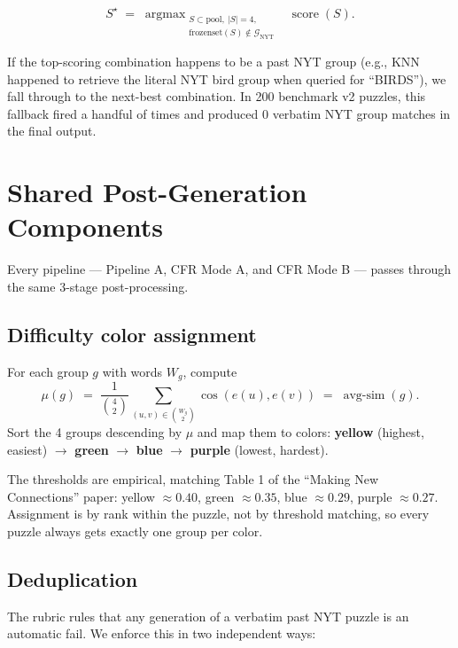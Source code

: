 \documentclass[11pt, letterpaper]{article}
\begin{document}
\begin{equation}
S^{\star} \;=\; \mathop{\arg\max}_{\substack{S \subset \text{pool},\ |S|=4, \\ \text{frozenset}(S) \notin \mathcal{G}_\text{NYT}}} \;\; \operatorname{score}(S).
\end{equation}

If the top-scoring combination happens to be a past NYT group (e.g., KNN happened
to retrieve the literal NYT bird group when queried for ``BIRDS''), we fall through
to the next-best combination. In 200 benchmark v2 puzzles, this fallback fired a
handful of times and produced 0 verbatim NYT group matches in the final output.

\section{Shared Post-Generation Components}

Every pipeline --- Pipeline A, CFR Mode A, and CFR Mode B --- passes through the
same 3-stage post-processing.

\subsection{Difficulty color assignment}
For each group $g$ with words $W_g$, compute
\begin{equation}
\mu(g) \;=\; \frac{1}{\binom{4}{2}} \sum_{(u, v) \in \binom{W_g}{2}} \cos(e(u), e(v)) \;=\; \operatorname{avg-sim}(g).
\end{equation}
Sort the 4 groups descending by $\mu$ and map them to colors:
\textcolor{yellow_conn!80!black}{\textbf{yellow}} (highest, easiest) $\to$
\textcolor{green_conn!80!black}{\textbf{green}} $\to$
\textcolor{blue_conn!70!black}{\textbf{blue}} $\to$
\textcolor{purple_conn!70!black}{\textbf{purple}} (lowest, hardest).

The thresholds are empirical, matching Table 1 of the ``Making New Connections''
paper: yellow $\approx 0.40$, green $\approx 0.35$, blue $\approx 0.29$, purple $\approx 0.27$.
Assignment is by rank within the puzzle, not by threshold matching, so every
puzzle always gets exactly one group per color.

\subsection{Deduplication}
\label{sec:dedup}
The rubric rules that any generation of a verbatim past NYT puzzle is an automatic
fail. We enforce this in two independent ways:
\end{document}
